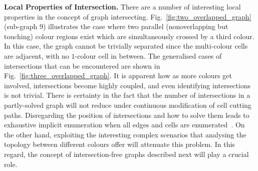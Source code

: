 \documentclass[journal]{IEEEtran}
\begin{document}
\textbf{Local Properties of Intersection.}
There are a number of interesting local properties in the concept of graph intersecting. 
Fig.~\ref{fig:two_overlapped_graph} (sub-graph $9$) illustrates the case where two parallel (nonoverlapping but touching) colour regions exist which are simultaneously crossed by a third colour. In this case, the graph cannot be trivially separated since the multi-colour cells are adjacent, with no $1$-colour cell in between. The generalised cases of intersections that can be encountered are shown in Fig.~\ref{fig:three_overlapped_graph}. 
It is apparent how as more colours get involved, %
intersections become highly coupled, and even identifying intersections is not trivial. 
There is certainty in the fact that the number of intersections in a partly-solved graph will not reduce under continuous modification of cell cutting paths. 
Disregarding the position of intersections and how to solve them leads to exhaustive implicit enumeration when all edges and cells are enumerated~\cite{Yang2020Cellular}. 
On the other hand, exploiting the interesting complex scenarios that analysing the topology between different colours offer will attenuate this problem. In this regard, the concept of intersection-free graphs described next will play a crucial role.  
\end{document}
